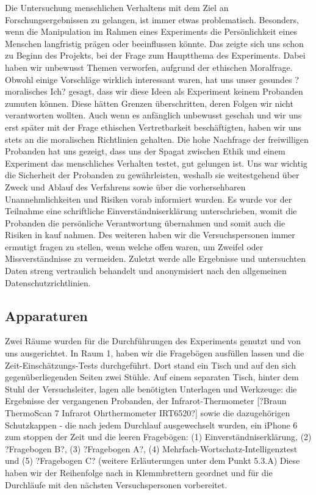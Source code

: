 \documentclass{Bericht}
\begin{document}
Die Untersuchung menschlichen Verhaltens mit dem Ziel an Forschungsergebnissen zu gelangen, ist immer etwas problematisch. Besonders, wenn die Manipulation im Rahmen eines Experiments die Persönlichkeit eines Menschen langfristig prägen oder beeinflussen könnte. Das zeigte sich uns schon zu Beginn des Projekts, bei der Frage zum Hauptthema des Experiments. Dabei haben wir unbewusst Themen verworfen, aufgrund der ethischen Moralfrage. Obwohl einige Vorschläge wirklich interessant waren, hat uns unser gesundes ?moralisches Ich? gesagt, dass wir diese Ideen als Experiment keinem Probanden zumuten können. Diese hätten Grenzen überschritten, deren Folgen wir nicht verantworten wollten. Auch wenn es anfänglich unbewusst geschah und wir uns erst später mit der Frage ethischen Vertretbarkeit beschäftigten, haben wir uns stets an die  moralischen Richtlinien gehalten. Die hohe Nachfrage der freiwilligen Probanden hat uns gezeigt, dass uns der Spagat zwischen Ethik und einem Experiment  das menschliches Verhalten testet, gut gelungen ist. Uns war wichtig die Sicherheit der Probanden zu gewährleisten, weshalb sie weitestgehend über Zweck und Ablauf des Verfahrens sowie über die vorhersehbaren Unannehmlichkeiten und Risiken vorab informiert wurden. Es wurde vor der Teilnahme eine schriftliche Einverständniserklärung unterschrieben, womit die Probanden die persönliche Verantwortung übernahmen und somit auch die Risiken in kauf nahmen. Des weiteren haben wir die Versuchspersonen immer ermutigt fragen zu stellen, wenn welche offen waren, um Zweifel oder Missverständnisse zu vermeiden. Zuletzt werde alle Ergebnisse und untersuchten Daten streng vertraulich behandelt und anonymisiert nach den allgemeinen Datenschutzrichtlinien.


\subsection {Apparaturen}

Zwei Räume wurden für die Durchführungen des Experiments genutzt und von uns ausgerichtet. In Raum 1, haben wir die Fragebögen ausfüllen lassen und die Zeit-Einschätzungs-Tests durchgeführt. Dort stand ein Tisch und auf den sich gegenüberliegenden Seiten zwei Stühle. Auf einem separaten Tisch, hinter dem Stuhl der Versuchsleiter, lagen alle benötigten Unterlagen und Werkzeuge: die Ergebnisse der vergangenen Probanden, der Infrarot-Thermometer [?Braun ThermoScan 7 Infrarot Ohrthermometer IRT6520?] sowie die dazugehörigen Schutzkappen - die nach jedem Durchlauf ausgewechselt wurden, ein iPhone 6 zum stoppen der Zeit und die leeren Fragebögen: (1) Einverständniserklärung, (2) ?Fragebogen B?, (3) ?Fragebogen A?, (4) Mehrfach-Wortschatz-Intelligenztest und (5) ?Fragebogen C? (weitere Erläuterungen unter dem Punkt 5.3.A) Diese haben wir der Reihenfolge nach in Klemmbrettern geordnet und für die Durchläufe mit den nächsten Versuchspersonen vorbereitet. 
\end{document}
